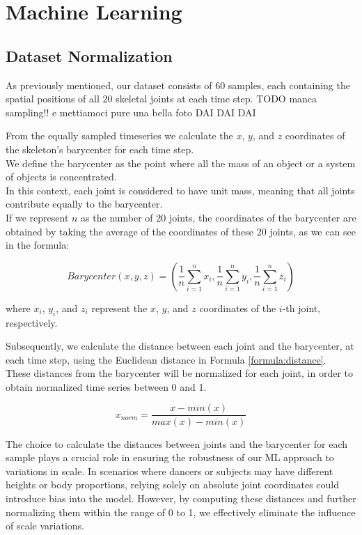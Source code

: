 \chapter{Machine Learning}

\section{Dataset Normalization}
As previously mentioned, our dataset consists of 60 samples, each containing the spatial positions of all 20 skeletal joints at each time step.
TODO manca sampling!! e mettiamoci pure una bella foto DAI DAI DAI

From the equally sampled timeseries we calculate the $x$, $y$, and $z$ coordinates of the skeleton's barycenter for each time step. \\
We define the barycenter as the point where all the mass of an object or a system of objects is concentrated. \\
In this context, each joint is considered to have unit mass, meaning that all joints contribute equally to the barycenter. \\
If we represent $n$ as the number of 20 joints, the coordinates of the barycenter are obtained by taking the average of the coordinates of these 20 joints, as we can see in the formula:


\begin{equation}
    Barycenter (x, y, z) = \left(\frac{1}{n} \sum_{i=1}^{n} x_i, \frac{1}{n} \sum_{i=1}^{n} y_i, \frac{1}{n} \sum_{i=1}^{n} z_i\right)
    \label{formula:baricentro}
\end{equation}
    
where $x_i$, $y_i$, and $z_i$ represent the $x$, $y$, and $z$ coordinates of the $i$-th joint, respectively.

Subsequently, we calculate the distance between each joint and the barycenter, at each time step, using the Euclidean distance in Formula \ref{formula:distance}. \\
These distances from the barycenter will be normalized for each joint, in order to obtain normalized time series between 0 and 1.

\begin{equation}
    x_{norm} = \frac{{x - min(x)}}{{max(x) - min(x)}}
    \label{formula:normalization}
\end{equation}
    
The choice to calculate the distances between joints and the barycenter for each sample plays a crucial role in ensuring the robustness of our ML approach to variations in scale.
In scenarios where dancers or subjects may have different heights or body proportions, relying solely on absolute joint coordinates could introduce bias into the model.
However, by computing these distances and further normalizing them within the range of 0 to 1, we effectively eliminate the influence of scale variations.

